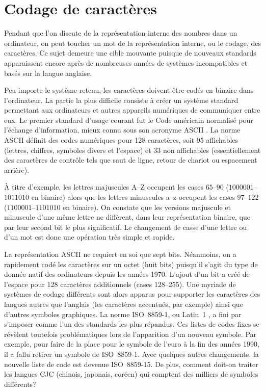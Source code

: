 \documentclass[letterpaper,11pt,english,french]{memoir}
\theoremstyle{plain}
\theoremstyle{definition}
\theoremstyle{remark}
\begin{document}
\section{Codage de caractères}
\label{sec:ordinateurs:codage}

Pendant que l'on discute de la représentation interne des nombres dans
un ordinateur, on peut toucher un mot de la représentation interne, ou
le codage, des caractères. Ce sujet demeure une cible mouvante puisque
de nouveaux standards apparaissent encore après de nombreuses années
de systèmes incompatibles et basés sur la langue anglaise.

Peu importe le système retenu, les caractères doivent être codés en
binaire dans l'ordinateur. La partie la plus difficile consiste à
créer un système standard permettant aux ordinateurs et autres
appareils numériques de communiquer entre eux. Le premier standard
d'usage courant fut le Code américain normalisé pour l'échange
d'information, mieux connu sous son acronyme ASCII \citep{ASCII}. La
norme ASCII définit des codes numériques pour 128 caractères, soit 95
affichables (lettres, chiffres, symboles divers et l'espace) et 33 non
affichables (essentiellement des caractères de contrôle tels que saut
de ligne, retour de chariot ou espacement arrière).

À titre d'exemple, les lettres majuscules A--Z occupent les cases
$65$--$90$ ($1000001$--$1011010$ en binaire) alors que les lettres
minuscules a--z occupent les cases $97$--$122$ ($1100001$--$1101010$
en binaire). On constate que les versions majuscule et minuscule d'une
même lettre ne diffèrent, dans leur représentation binaire, que par
leur second bit le plus significatif. Le changement de casse d'une
lettre ou d'un mot est donc une opération très simple et rapide.

La représentation ASCII ne requiert en soi que sept bits. Néanmoins,
on a rapidement codé les caractères sur un octet (huit bits) puisqu'il
s'agit du type de donnée natif des ordinateurs depuis les années 1970.
L'ajout d'un bit a créé de l'espace pour 128 caractères additionnels
(cases 128--255). Une myriade de systèmes de codage différents sont
alors apparus pour supporter les caractères des langues autres que
l'anglais (les caractères accentués, par exemple) ainsi que d'autres
symboles graphiques. La norme ISO~8859-1, ou Latin~1
\citep{ISO:8859-1}, a fini par s'imposer comme l'un des standards les
plus répandus. Ces listes de codes fixes se révèlent toutefois
problématiques lors de l'apparition d'un nouveau symbole. Par exemple,
pour faire de la place pour le symbole de l'euro à la fin des années
1990, il a fallu retirer un symbole de ISO~8859-1. Avec quelques
autres changements, la nouvelle liste de code est devenue ISO~8859-15.
De plus, comment doit-on traiter les langues CJC (chinois, japonais,
coréen) qui comptent des milliers de symboles différents?
\end{document}
